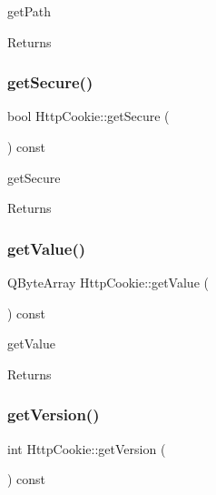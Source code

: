 get\+Path 

\begin{DoxyReturn}{Returns}

\end{DoxyReturn}
\mbox{\label{class_http_cookie_a270cd78805263b5ed80f4e3354caf4e4}} 
\subsubsection{\texorpdfstring{get\+Secure()}{getSecure()}}
{\footnotesize\ttfamily bool Http\+Cookie\+::get\+Secure (\begin{DoxyParamCaption}{ }\end{DoxyParamCaption}) const}



get\+Secure 

\begin{DoxyReturn}{Returns}

\end{DoxyReturn}
\mbox{\label{class_http_cookie_a04d3cdafe9c7e5f9068816abf33aa4a9}} 
\subsubsection{\texorpdfstring{get\+Value()}{getValue()}}
{\footnotesize\ttfamily Q\+Byte\+Array Http\+Cookie\+::get\+Value (\begin{DoxyParamCaption}{ }\end{DoxyParamCaption}) const}



get\+Value 

\begin{DoxyReturn}{Returns}

\end{DoxyReturn}
\mbox{\label{class_http_cookie_ac390582430915aa5570c6a397f20210d}} 
\subsubsection{\texorpdfstring{get\+Version()}{getVersion()}}
{\footnotesize\ttfamily int Http\+Cookie\+::get\+Version (\begin{DoxyParamCaption}{ }\end{DoxyParamCaption}) const}



